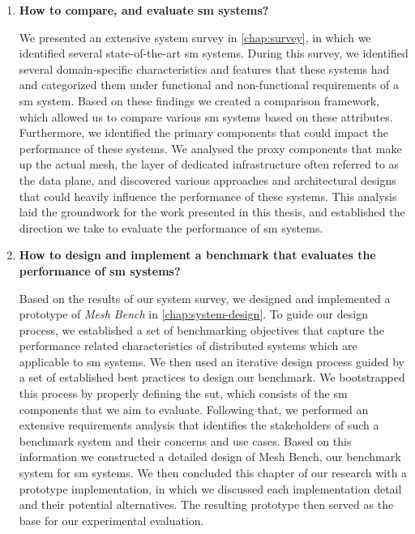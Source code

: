 \begin{enumerate}[label=\textbf{RQ\arabic*}, leftmargin=3\parindent]
    \item \textbf{How to compare, and evaluate \gls{sm} systems?}
    \label{rq-1:ans}
    
    We presented an extensive system survey in \cref{chap:survey}, in which we identified several state-of-the-art \gls{sm} systems. During this survey, we identified several domain-specific characteristics and features that these systems had and categorized them under functional and non-functional requirements of a \gls{sm} system. Based on these findings we created a comparison framework, which allowed us to compare various \gls{sm} systems based on these attributes. Furthermore, we identified the primary components that could impact the performance of these systems. We analysed the proxy components that make up the actual mesh, the layer of dedicated infrastructure often referred to as the data plane, and discovered various approaches and architectural designs that could heavily influence the performance of these systems. This analysis laid the groundwork for the work presented in this thesis, and established the direction we take to evaluate the performance of \gls{sm} systems.

    
    \item \textbf{How to design and implement a benchmark that evaluates the performance of \gls{sm} systems?}
    \label{rq-2:ans}
    
    Based on the results of our system survey, we designed and implemented a prototype of \textit{Mesh Bench} in \cref{chap:system-design}. To guide our design process, we established a set of benchmarking objectives that capture the performance related characteristics of distributed systems which are applicable to \gls{sm} systems. We then used an iterative design process guided by a set of established best practices to design our benchmark. We bootstrapped this process by properly defining the \gls{sut}, which consists of the \gls{sm} components that we aim to evaluate. Following that, we performed an extensive requirements analysis that identifies the stakeholders of such a benchmark system and their concerns and use cases. Based on this information we constructed a detailed design of Mesh Bench, our benchmark system for \gls{sm} systems. We then concluded this chapter of our research with a prototype implementation, in which we discussed each implementation detail and their potential alternatives. The resulting prototype then served as the base for our experimental evaluation.
    

\end{enumerate}
